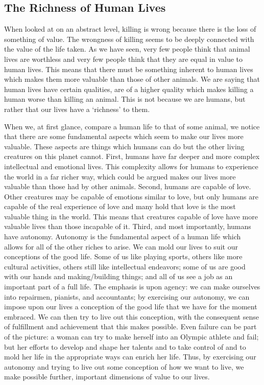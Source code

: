 \subsection{The Richness of Human Lives}

When looked at on an abstract level, killing is wrong because there is the loss of something of value. The wrongness of killing seems to be deeply connected with the value of the life taken. As we have seen, very few people think that animal lives are worthless and very few people think that they are equal in value to human lives. This means that there must be something inherent to human lives which makes them more valuable than those of other animals. We are saying that human lives have certain qualities, are of a higher quality which makes killing a human worse than killing an animal. This is not because we are humans, but rather that our lives have a ‘richness’ to them.

When we, at first glance, compare a human life to that of some animal, we notice that there are some fundamental aspects which seem to make our lives more valuable. These aspects are things which humans can do but the other living creatures on this planet cannot. First, humans have far deeper and more complex intellectual and emotional lives. This complexity allows for humans to experience the world in a far richer way, which could be argued makes our lives more valuable than those had by other animals. Second, humans are capable of love. Other creatures may be capable of emotions similar to love, but only humans are capable of the real experience of love and many hold that love is the most valuable thing in the world. This means that creatures capable of love have more valuable lives than those incapable of it. Third, and most importantly, humans have autonomy. Autonomy is the fundamental aspect of a human life which allows for all of the other riches to arise.  We can mold our lives to suit our conceptions of the good life. Some of us like playing sports, others like more cultural activities, others still like intellectual endeavors; some of us are good with our hands and making/building things; and all of us see a job as an important part of a full life. The emphasis is upon agency: we can make ourselves into repairmen, pianists, and accountants; by exercising our autonomy, we can impose upon our lives a conception of the good life that we have for the moment embraced. We can then try to live out this conception, with the consequent sense of fulfillment and achievement that this makes possible. Even failure can be part of the picture: a woman can try to make herself into an Olympic athlete and fail; but her efforts to develop and shape her talents and to take control of and to mold her life in the appropriate ways can enrich her life. Thus, by exercising our autonomy and trying to live out some conception of how we want to live, we make possible further, important dimensions of value to our lives.

